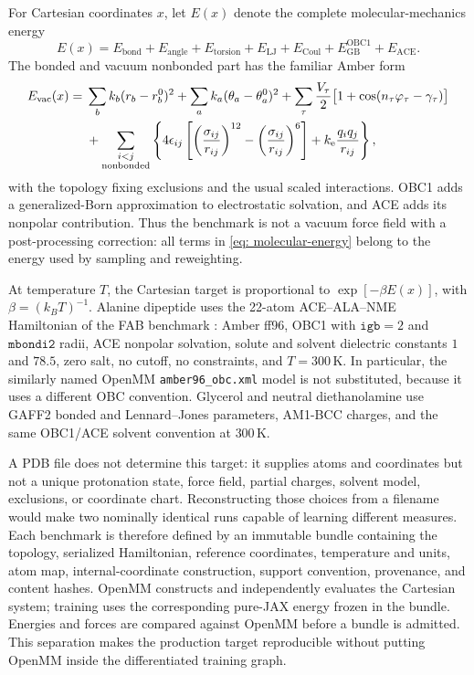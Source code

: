 \documentclass{article}
\begin{document}
For Cartesian coordinates \(x\), let \(E(x)\) denote the complete molecular-mechanics energy
\begin{equation}
E(x)
=E_{\mathrm{bond}}+E_{\mathrm{angle}}+E_{\mathrm{torsion}}
 +E_{\mathrm{LJ}}+E_{\mathrm{Coul}}
 +E_{\mathrm{GB}}^{\mathrm{OBC1}}+E_{\mathrm{ACE}} .
\label{eq: molecular-energy}
\end{equation}
The bonded and vacuum nonbonded part has the familiar Amber form \citep{cornell1995amber}
\begin{align}
E_{\mathrm{vac}}(x)
={}&\sum_{b} k_b(r_b-r_b^0)^2
 +\sum_{a} k_a(\theta_a-\theta_a^0)^2
 +\sum_{\tau}\frac{V_\tau}{2}
       \bigl[1+\cos(n_\tau\varphi_\tau-\gamma_\tau)\bigr] \notag\\
&+\sum_{\substack{i<j\\\mathrm{nonbonded}}}
 \left\lbrace 4\epsilon_{ij}\left[
 \left(\frac{\sigma_{ij}}{r_{ij}}\right)^{12}
 -\left(\frac{\sigma_{ij}}{r_{ij}}\right)^6\right]
 +k_{\mathrm e}\frac{q_iq_j}{r_{ij}}\right\rbrace,
\label{eq: molecular-amber-energy}
\end{align}
with the topology fixing exclusions and the usual scaled interactions. OBC1 adds a generalized-Born approximation to electrostatic solvation, and ACE adds its nonpolar contribution. Thus the benchmark is not a vacuum force field with a post-processing correction: all terms in \eqref{eq: molecular-energy} belong to the energy used by sampling and reweighting.

At temperature \(T\), the Cartesian target is proportional to \(\exp[-\beta E(x)]\), with \(\beta=(k_BT)^{-1}\). Alanine dipeptide uses the 22-atom ACE--ALA--NME Hamiltonian of the FAB benchmark \citep{midgley2022flow}: Amber ff96, OBC1 with \(\texttt{igb}=2\) and \(\texttt{mbondi2}\) radii, ACE nonpolar solvation, solute and solvent dielectric constants \(1\) and \(78.5\), zero salt, no cutoff, no constraints, and \(T=300\,\mathrm K\). In particular, the similarly named OpenMM \texttt{amber96\_obc.xml} model is not substituted, because it uses a different OBC convention. Glycerol and neutral diethanolamine use GAFF2 bonded and Lennard--Jones parameters, AM1-BCC charges, and the same OBC1/ACE solvent convention at \(300\,\mathrm K\).

A PDB file does not determine this target: it supplies atoms and coordinates but not a unique protonation state, force field, partial charges, solvent model, exclusions, or coordinate chart. Reconstructing those choices from a filename would make two nominally identical runs capable of learning different measures. Each benchmark is therefore defined by an immutable bundle containing the topology, serialized Hamiltonian, reference coordinates, temperature and units, atom map, internal-coordinate construction, support convention, provenance, and content hashes. OpenMM constructs and independently evaluates the Cartesian system; training uses the corresponding pure-JAX energy frozen in the bundle. Energies and forces are compared against OpenMM before a bundle is admitted. This separation makes the production target reproducible without putting OpenMM inside the differentiated training graph.
\end{document}
